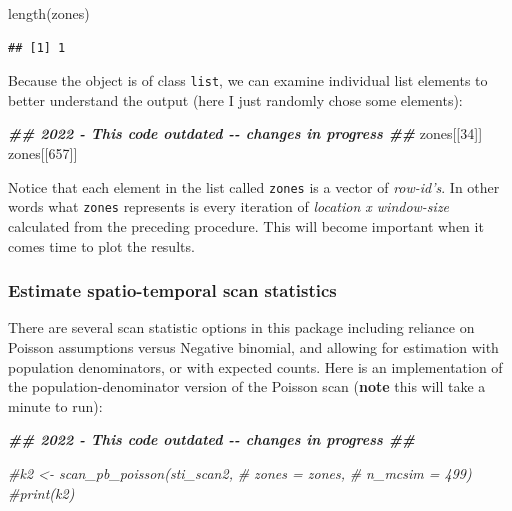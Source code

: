 \documentclass[
]{book}
\newenvironment{Shaded}{\begin{snugshade}}{\end{snugshade}}
\newcommand{\CommentTok}[1]{\textcolor[rgb]{0.56,0.35,0.01}{\textit{#1}}}
\newcommand{\DecValTok}[1]{\textcolor[rgb]{0.00,0.00,0.81}{#1}}
\newcommand{\DocumentationTok}[1]{\textcolor[rgb]{0.56,0.35,0.01}{\textbf{\textit{#1}}}}
\newcommand{\FunctionTok}[1]{\textcolor[rgb]{0.00,0.00,0.00}{#1}}
\newcommand{\NormalTok}[1]{#1}
\begin{document}
\begin{Shaded}
\begin{Highlighting}[]
\FunctionTok{length}\NormalTok{(zones)}
\end{Highlighting}
\end{Shaded}

\begin{verbatim}
## [1] 1
\end{verbatim}

Because the object is of class \texttt{list}, we can examine individual list elements to better understand the output (here I just randomly chose some elements):

\begin{Shaded}
\begin{Highlighting}[]
\DocumentationTok{\#\# 2022 {-} This code outdated {-}{-} changes in progress \#\#}
\NormalTok{zones[[}\DecValTok{34}\NormalTok{]]}
\NormalTok{zones[[}\DecValTok{657}\NormalTok{]]}
\end{Highlighting}
\end{Shaded}

Notice that each element in the list called \texttt{zones} is a vector of \emph{row-id's}. In other words what \texttt{zones} represents is every iteration of \emph{location x window-size} calculated from the preceding procedure. This will become important when it comes time to plot the results.

\hypertarget{estimate-spatio-temporal-scan-statistics}{%
\subsubsection{Estimate spatio-temporal scan statistics}\label{estimate-spatio-temporal-scan-statistics}}

There are several scan statistic options in this package including reliance on Poisson assumptions versus Negative binomial, and allowing for estimation with population denominators, or with expected counts. Here is an implementation of the population-denominator version of the Poisson scan (\textbf{note} this will take a minute to run):

\begin{Shaded}
\begin{Highlighting}[]
\DocumentationTok{\#\# 2022 {-} This code outdated {-}{-} changes in progress \#\#}

\CommentTok{\#k2 \textless{}{-} scan\_pb\_poisson(sti\_scan2, }
\CommentTok{\#                      zones = zones,}
\CommentTok{\#                      n\_mcsim = 499)}
\CommentTok{\#print(k2)}
\end{Highlighting}
\end{Shaded}
\end{document}
